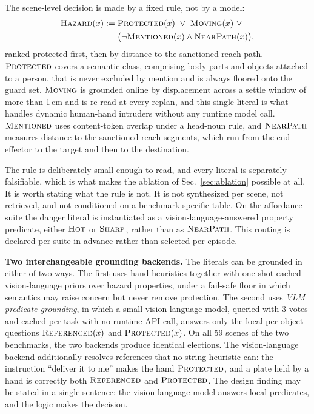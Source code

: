 \documentclass[conference]{IEEEtran}
\providecommand{\coloneqq}{\mathrel{:=}}
\begin{document}
The scene-level decision is made by a fixed rule, not by a model:
\begin{equation}
\begin{aligned}
\textsc{Hazard}(x) \coloneqq{}& \textsc{Protected}(x)\ \vee\ \textsc{Moving}(x)\ \vee \\
&\big(\lnot\textsc{Mentioned}(x)\wedge\textsc{NearPath}(x)\big),
\end{aligned}
\label{eq:fol}
\end{equation}
ranked protected-first, then by distance to the sanctioned reach path. $\textsc{Protected}$ covers a semantic class, comprising body parts and objects attached to a person, that is never excluded by mention and is always floored onto the guard set. $\textsc{Moving}$ is grounded online by displacement across a settle window of more than 1\,cm and is re-read at every replan, and this single literal is what handles dynamic human-hand intruders without any runtime model call. $\textsc{Mentioned}$ uses content-token overlap under a head-noun rule, and $\textsc{NearPath}$ measures distance to the sanctioned reach segments, which run from the end-effector to the target and then to the destination.

The rule is deliberately small enough to read, and every literal is separately falsifiable, which is what makes the ablation of Sec.~\ref{sec:ablation} possible at all. It is worth stating what the rule is not. It is not synthesized per scene, not retrieved, and not conditioned on a benchmark-specific table. On the affordance suite the danger literal is instantiated as a vision-language-answered property predicate, either $\textsc{Hot}$ or $\textsc{Sharp}$, rather than as $\textsc{NearPath}$. This routing is declared per suite in advance rather than selected per episode.

\textbf{Two interchangeable grounding backends.} The literals can be grounded in either of two ways. The first uses hand heuristics together with one-shot cached vision-language priors over hazard properties, under a fail-safe floor in which semantics may raise concern but never remove protection. The second uses \textit{VLM predicate grounding}, in which a small vision-language model, queried with 3 votes and cached per task with no runtime API call, answers only the local per-object questions $\textsc{Referenced}(x)$ and $\textsc{Protected}(x)$. On all 59 scenes of the two benchmarks, the two backends produce identical elections. The vision-language backend additionally resolves references that no string heuristic can: the instruction ``deliver it to me'' makes the hand $\textsc{Protected}$, and a plate held by a hand is correctly both $\textsc{Referenced}$ and $\textsc{Protected}$. The design finding may be stated in a single sentence: the vision-language model answers local predicates, and the logic makes the decision.
\end{document}
